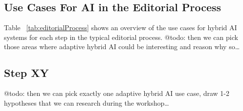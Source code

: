 \subsection{Use Cases For AI in the Editorial Process}

Table  ~\ref{tab:editorialProcess} shows an overview of the use cases for hybrid AI systems for each step in the typical editorial process.
{\color{purple} @todo: then we can pick those areas where adaptive hybrid AI could be interesting and reason why so\dots}


\subsection{Step XY}

{\color{purple} @todo: then we can pick exactly one adaptive hybrid AI use case, draw 1-2 hypotheses that we can research 
during the workshop\dots}


